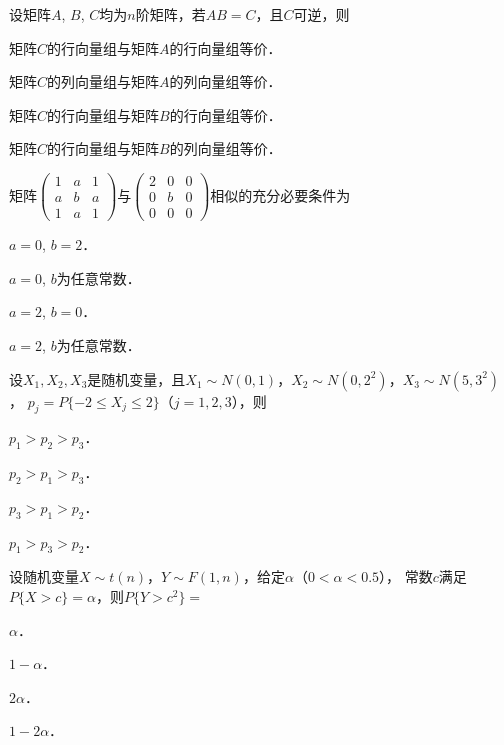 \documentclass[plain,noanswer,medmath]{../../template/jnuexam}
\begin{document}
\begin{problem}
设矩阵$A$, $B$, $C$均为$n$阶矩阵，若$AB = C$，且$C$可逆，则\pickout{}
\begin{abcd}
\item 矩阵$C$的行向量组与矩阵$A$的行向量组等价．
\item 矩阵$C$的列向量组与矩阵$A$的列向量组等价．
\item 矩阵$C$的行向量组与矩阵$B$的行向量组等价．
\item 矩阵$C$的行向量组与矩阵$B$的列向量组等价．
\end{abcd}
\end{problem}


\begin{problem}
矩阵$\begin{pmatrix}
  1 & a & 1 \\
  a & b & a \\
  1 & a & 1
\end{pmatrix}$与$\begin{pmatrix}
  2 & 0 & 0 \\
  0 & b & 0 \\
  0 & 0 & 0
\end{pmatrix}$相似的充分必要条件为\pickout{}
\begin{abcd}
\item $a = 0$, $b = 2$．
\item $a = 0$, $b$为任意常数．
\item $a = 2$, $b = 0$．
\item $a = 2$, $b$为任意常数．
\end{abcd}
\end{problem}


\begin{problem}
设$X_1,X_2,X_3$是随机变量，且$X_1\sim N(0,1)$，$X_2\sim N(0,2^2)$，$X_3\sim N(5,3^2)$，\goodbreak
$p_j = P\{-2 \le X_j \le 2\}$（$j = 1,2,3$），则\pickout{}
\begin{abcd}
\item $p_1 > p_2 > p_3$．
\item $p_2 > p_1 > p_3$．
\item $p_3 > p_1 > p_2$．
\item $p_1 > p_3 > p_2$．
\end{abcd}
\end{problem}


\begin{problem}
设随机变量$X\sim t(n)$，$Y\sim F(1,n)$，给定$\alpha$（$0 < \alpha < 0.5$），
常数$c$满足$P\{X > c\} = \alpha$，则$P\{Y > c^2\} =$\pickout{}
\begin{abcd}
\item $\alpha$．
\item $1 - \alpha$．
\item $2\alpha$．
\item $1 - 2\alpha$．
\end{abcd}
\end{problem}
\end{document}
